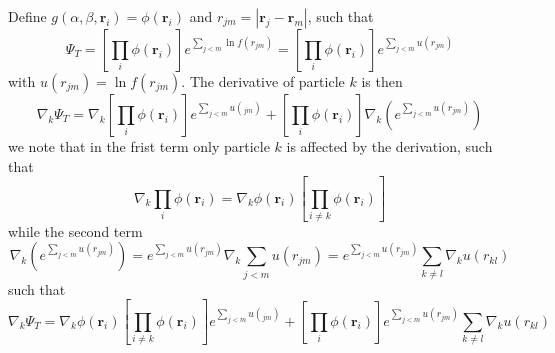 \documentclass[a4paper, 10pt, english]{revtex4-2} %
\begin{document}
    Define $g(\alpha, \beta, \mathbf{r}_i) = \phi(\mathbf{r}_i)$ and $r_{jm} = |\mathbf{r}_j - \mathbf{r}_m|$, such that
    \begin{equation}
            \Psi_T 
        =   \left[\prod_i\phi(\mathbf{r}_i)\right] e^{\sum_{j<m} \ln{f(r_{jm})}}
        =   \left[\prod_i\phi(\mathbf{r}_i)\right] e^{\sum_{j<m} u(r_{jm})}
    \end{equation}
    with $u(r_{jm}) = \ln{f(r_{jm})}$. The derivative of particle $k$ is then
    \begin{equation}
            \nabla_k\Psi_T 
        =   \nabla_k\left[\prod_i \phi(\mathbf{r}_i)\right]e^{\sum_{j<m} u(_{jm})} + \left[\prod_i\phi(\mathbf{r}_i)\right] \nabla_k\left(e^{\sum_{j<m} u(r_{jm})}\right)
    \end{equation}
    we note that in the frist term only particle $k$ is affected by the derivation, such that
    \begin{equation}
            \nabla_k\prod_i \phi(\mathbf{r}_i) 
        =   \nabla_k\phi(\mathbf{r}_i)\left[\prod_{i\neq k}\phi(\mathbf{r}_i)\right]
    \end{equation}
    while the second term
    \begin{equation}
                \nabla_k\left(e^{\sum_{j<m} u(r_{jm})}\right)
            =   e^{\sum_{j<m} u(r_{jm})} \nabla_k\sum_{j<m}u(r_{jm})
            =   e^{\sum_{j<m} u(r_{jm})} \sum_{k\neq l}\nabla_k u(r_{kl})
    \end{equation}
    such that
    \begin{equation}
            \nabla_k\Psi_T 
        =   \nabla_k\phi(\mathbf{r}_i)\left[\prod_{i\neq k}\phi(\mathbf{r}_i)\right] e^{\sum_{j<m} u(_{jm})} + \left[\prod_i\phi(\mathbf{r}_i)\right] e^{\sum_{j<m} u(r_{jm})} \sum_{k\neq l}\nabla_k u(r_{kl})
    \end{equation}
\end{document}
